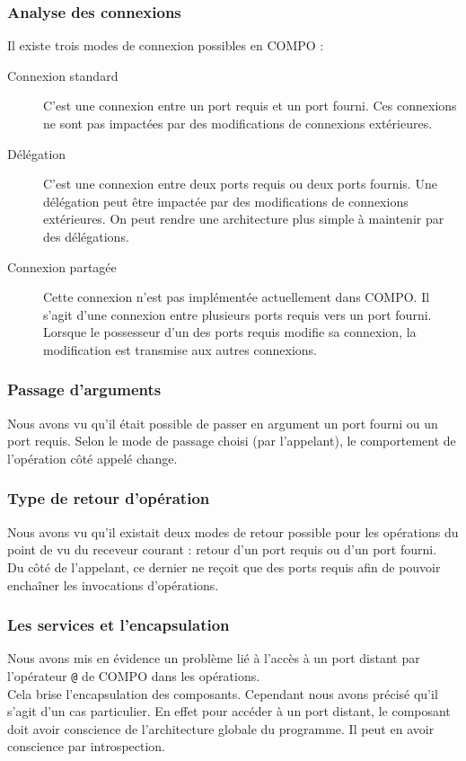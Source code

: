 \documentclass[11pt,a4paper,openany,oneside]{book}
\begin{document}
\subsubsection{Analyse des connexions}
Il existe trois modes de connexion possibles en COMPO : 
\begin{description}
\item[Connexion standard]C'est une connexion entre un port requis et un port fourni. Ces connexions ne sont pas impactées par des modifications de connexions extérieures.
\item[Délégation]C'est une connexion entre deux ports requis ou deux ports fournis. Une délégation peut être impactée par des modifications de connexions extérieures. On peut rendre une architecture plus simple à maintenir par des délégations.
\item[Connexion partagée]Cette connexion n'est pas implémentée actuellement dans COMPO. Il s'agit d'une connexion entre plusieurs ports requis vers un port fourni. Lorsque le possesseur d'un des ports requis modifie sa connexion, la modification est transmise aux autres connexions.
\end{description}

\subsubsection{Passage d'arguments}
Nous avons vu qu'il était possible de passer en argument un port fourni ou un port requis. Selon le mode de passage choisi (par l'appelant), le comportement de l'opération côté appelé change.

\subsubsection{Type de retour d'opération}
Nous avons vu qu'il existait deux modes de retour possible pour les opérations du point de vu du receveur courant : retour d'un port requis ou d'un port fourni.\\
Du côté de l'appelant, ce dernier ne reçoit que des ports requis afin de pouvoir enchaîner les invocations d'opérations.

\subsubsection{Les services et l'encapsulation}
Nous avons mis en évidence un problème lié à l'accès à un port distant par l'opérateur \texttt{@} de COMPO dans les opérations.\\
Cela brise l'encapsulation des composants. Cependant nous avons précisé qu'il s'agit d'un cas particulier. En effet pour accéder à un port distant, le composant doit avoir conscience de l'architecture globale du programme. Il peut en avoir conscience par introspection.
\end{document}
